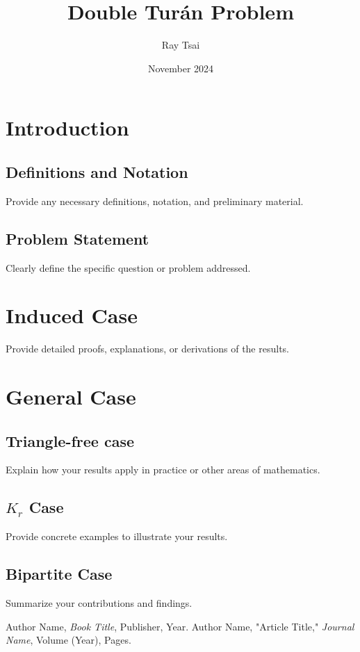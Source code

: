 \documentclass[12pt]{report}
\title{Double Turán Problem}
\author{Ray Tsai}
\date{November 2024}
\begin{document}
\maketitle



\tableofcontents

\chapter{Introduction}

\section{Definitions and Notation}
Provide any necessary definitions, notation, and preliminary material.

\section{Problem Statement}
Clearly define the specific question or problem addressed.

\chapter{Induced Case}
Provide detailed proofs, explanations, or derivations of the results.

\chapter{General Case}
\section{Triangle-free case}
Explain how your results apply in practice or other areas of mathematics.

\section{$K_r$ Case}
Provide concrete examples to illustrate your results.

\section{Bipartite Case}
Summarize your contributions and findings.

\begin{thebibliography}{99}
 Author Name, \textit{Book Title}, Publisher, Year.
 Author Name, "Article Title," \textit{Journal Name}, Volume (Year), Pages.
\end{thebibliography}
\end{document}
